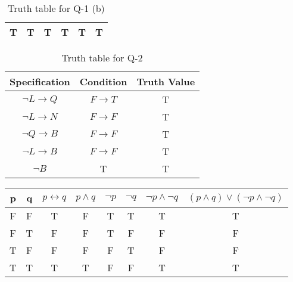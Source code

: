 \documentclass{article}
\begin{document}
\begin{enumerate}
\begin{table} [H]
\begin{tabular}{ | c | c | c | c | c | c | }
                \hline
                T & T & T & T & T & T \\ [1ex] 
                \hline
                \end{tabular}
                \caption{Truth table for Q-1 (b)}
                \label {table:2}
        \end{table}
        \begin{table} [H]
                \centering
                \begin{tabular}{ | c | c | c | }
                \hline
                \textbf{Specification} & \textbf{Condition} & \textbf{Truth Value} \\ [0.5 ex]
                \hline 
                $ \neg L \rightarrow Q$ & $F \rightarrow T$ & T \\
                \hline
                $ \neg L \rightarrow N$ & $F \rightarrow F$ & T \\
                \hline
                $ \neg Q \rightarrow B$ & $F \rightarrow F$ & T \\
                \hline
                $ \neg L \rightarrow B$ & $F \rightarrow F$ & T \\
                \hline
                $ \neg B $ & T & T \\ [1ex]
                \hline
                \end{tabular}
                \caption{Truth table for Q-2}
                \label {table:3}
        \end{table}
        \begin{table} [H]
                \centering
                \begin{tabular}{ | c | c | c | c | c | c | c | c | }
                \hline
                \textbf{p} & \textbf{q} & \textbf{$p \leftrightarrow q$} & \textbf{$p \wedge q$} & \textbf{$ \neg p$} & \textbf{$ \neg q$} & \textbf{$ \neg p \wedge \neg q$} & \textbf{$(p \wedge q) \vee (\neg p \wedge \neg q)$} \\ [0.5 ex]
                \hline 
                F & F & T & F & T & T & T & T \\
                \hline
                F & T & F & F & T & F & F & F \\
                \hline
                T & F & F & F & F & T & F & F \\
                \hline
                T & T & T & T & F & F & T & T \\ [1ex]
                \hline
                \end{tabular}

\end{table}
\end{enumerate}
\end{document}
